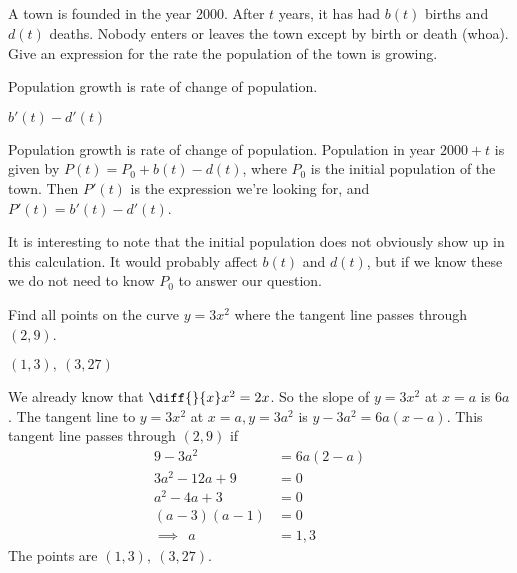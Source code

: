 \subsection*{\Application}

\begin{Mquestion}A town is founded in the year 2000. After $t$ years, it has had $b(t)$ births and $d(t)$ deaths. Nobody enters or leaves the town except by birth or death (whoa). Give an expression for the rate the population of the town is growing.
\end{Mquestion}
\begin{hint} Population growth is rate of change of population.
\end{hint}
\begin{answer} $b'(t)-d'(t)$
\end{answer}
\begin{solution} Population growth is rate of change of population.
Population in year $2000+t$ is given by $P(t)=P_0+b(t)-d(t)$, where $P_0$ is the initial population of the town. Then $P'(t)$ is the expression we're looking for, and $P'(t)=b'(t)-d'(t)$.

It is interesting to note that the initial population does not obviously show up in this calculation. It would probably affect $b(t)$ and $d(t)$, but if we know these we do not need to know $P_0$ to answer our question.
\end{solution}


\begin{question}[1997D]Find all points on the curve $y=3x^2$ where the tangent
line passes through $(2,9)$.
\end{question}
\begin{answer}{$(1,3),\ (3,27)$}
\end{answer}
\begin{solution}
We already know that $\diff{}{x}x^2=2x$. So
the slope of $y=3x^2$ at $x=a$ is $6a$. The tangent line to
$y=3x^2$ at $x=a, y=3a^2$ is $y-3a^2=6a(x-a)$. This tangent line passes
through $(2,9)$ if
\begin{align*}
9-3a^2&=6a(2-a)\\
 3a^2-12a+9&=0\\
  a^2-4a+3&=0\\
  (a-3)(a-1)&=0\\
\implies~~a&=1,3
\end{align*}
The points are {$(1,3),\ (3,27)$}.
\end{solution}

